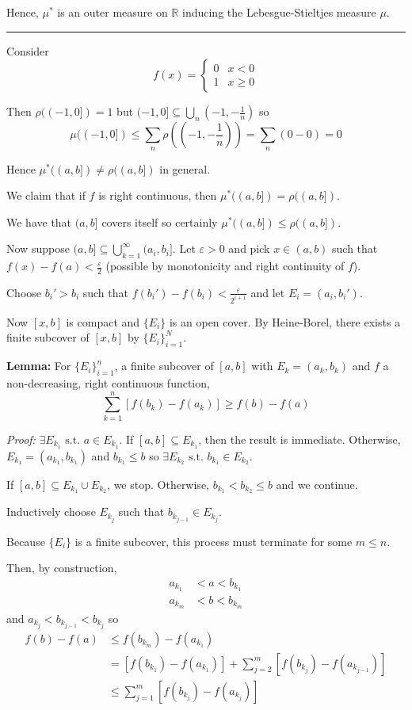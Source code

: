 \documentclass[12pt]{article}
\newcommand{\R}{\mathbb{R}}
\newcommand{\ep}{\varepsilon}
\newcommand{\sub}{\subseteq}
\newcommand{\st}{\text{ s.t. }}
\renewcommand{\div}{\vspace*{10pt}\hrule\vspace*{10pt}}
\newenvironment*{proof}[1][blue]{
    \begin{tcolorbox}[
        parbox=false,
        colback=#1!5!white,
        colframe=#1!75!black,
        coltext=#1,
        breakable
    ]}
    {\end{tcolorbox}}
\begin{document}
    Hence, $\mu^*$ is an outer measure on $\R$ inducing the Lebesgue-Stieltjes measure $\mu$.

    \div 
    
    Consider 
    \[f(x) = \begin{cases}
        0 & x < 0\\ 
        1 & x \geq 0
    \end{cases}\]

    Then $\rho((-1, 0]) = 1$ but $(-1, 0] \sub \bigcup_{n} (-1, -\frac{1}{n})$ so
    \[\mu((-1, 0])\leq \sum_n \rho((-1, -\frac{1}{n})) = \sum_n (0 - 0) = 0\]

    Hence $\mu^*((a, b]) \neq \rho((a, b])$ in general.

    We claim that if $f$ is right continuous, then $\mu^*((a, b]) = \rho((a, b])$.

    We have that $(a, b]$ covers itself so certainly $\mu^*((a, b]) \leq \rho((a, b])$.

    Now suppose $(a, b] \sub \bigcup_{k=1}^\infty (a_i, b_i]$. Let $\ep > 0$ and pick $x \in (a, b)$ such that $f(x) - f(a) < \frac{\ep}{2}$ (possible by monotonicity and right continuity of $f$). 

    Choose $b_i' > b_i$ such that $f(b_i') - f(b_i) < \frac{\ep}{2^{i+1}}$ and let $E_i = (a_i, b_i')$. 

    Now $[x, b]$ is compact and $\{E_i\}$ is an open cover. By Heine-Borel, there exists a finite subcover of $[x, b]$ by $\{E_i\}_{i=1}^N$.

    \begin{proof}
        \textbf{Lemma:} For $\{E_i\}_{i=1}^n$, a finite subcover of $[a, b]$ with $E_k = (a_k, b_k)$ and $f$ a non-decreasing, right continuous function,
        \[\sum_{k=1}^n [f(b_k) - f(a_k)] \geq f(b) - f(a)\]

        \emph{Proof:} $\exists E_{k_1} \st a \in E_{k_1}$. If $[a, b] \sub E_{k_1}$, then the result is immediate. Otherwise, $E_{k_1} = (a_{k_1}, b_{k_1})$ and $b_{k_1} \leq b$ so $\exists E_{k_2} \st b_{k_1} \in E_{k_2}$. 

        If $[a, b] \sub E_{k_1} \cup E_{k_2}$, we stop. Otherwise, $b_{k_1} < b_{k_2} \leq b$ and we continue. 

        Inductively choose $E_{k_j}$ such that $b_{k_{j-1}} \in E_{k_j}$. 

        Because $\{E_i\}$ is a finite subcover, this process must terminate for some $m \leq n$.

        Then, by construction, 
        \begin{align*}
            a_{k_1} &< a < b_{k_1}\\ 
            a_{k_m} &< b < b_{k_m}
        \end{align*}
        and $a_{k_j} < b_{k_{j-1}} < b_{k_j}$ so 
        \begin{align*}
            f(b) - f(a) &\leq f(b_{k_m}) - f(a_{k_1})\\
            &= [f(b_{k_1}) - f(a_{k_1})] + \sum_{j=2}^m [f(b_{k_j}) - f(a_{k_{j-1}})]\\
            &\leq \sum_{j=1}^m [f(b_{k_j}) - f(a_{k_j})]
        \end{align*}
    \end{proof}
    
\end{document}

